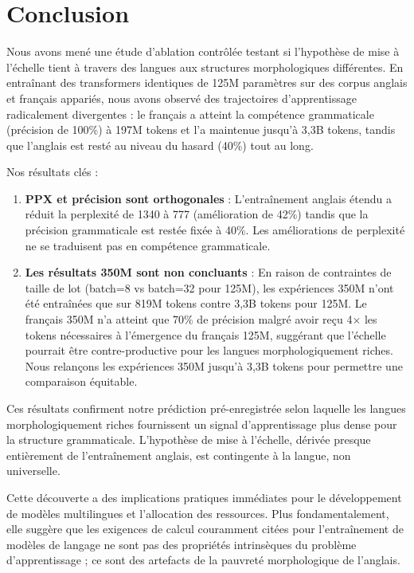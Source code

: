 \documentclass[11pt,a4paper]{article}
\begin{document}
\section{Conclusion}

Nous avons mené une étude d'ablation contrôlée testant si l'hypothèse de mise à l'échelle tient à travers des langues aux structures morphologiques différentes. En entraînant des transformers identiques de 125M paramètres sur des corpus anglais et français appariés, nous avons observé des trajectoires d'apprentissage radicalement divergentes : le français a atteint la compétence grammaticale (précision de 100\%) à 197M tokens et l'a maintenue jusqu'à 3,3B tokens, tandis que l'anglais est resté au niveau du hasard (40\%) tout au long.

Nos résultats clés :

\begin{enumerate}
    \item \textbf{PPX et précision sont orthogonales} : L'entraînement anglais étendu a réduit la perplexité de 1340 à 777 (amélioration de 42\%) tandis que la précision grammaticale est restée fixée à 40\%. Les améliorations de perplexité ne se traduisent pas en compétence grammaticale.

    \item \textbf{Les résultats 350M sont non concluants} : En raison de contraintes de taille de lot (batch=8 vs batch=32 pour 125M), les expériences 350M n'ont été entraînées que sur 819M tokens contre 3,3B tokens pour 125M. Le français 350M n'a atteint que 70\% de précision malgré avoir reçu 4$\times$ les tokens nécessaires à l'émergence du français 125M, suggérant que l'échelle pourrait être contre-productive pour les langues morphologiquement riches. Nous relançons les expériences 350M jusqu'à 3,3B tokens pour permettre une comparaison équitable.
\end{enumerate}

Ces résultats confirment notre prédiction pré-enregistrée selon laquelle les langues morphologiquement riches fournissent un signal d'apprentissage plus dense pour la structure grammaticale. L'hypothèse de mise à l'échelle, dérivée presque entièrement de l'entraînement anglais, est contingente à la langue, non universelle.

Cette découverte a des implications pratiques immédiates pour le développement de modèles multilingues et l'allocation des ressources. Plus fondamentalement, elle suggère que les exigences de calcul couramment citées pour l'entraînement de modèles de langage ne sont pas des propriétés intrinsèques du problème d'apprentissage ; ce sont des artefacts de la pauvreté morphologique de l'anglais.
\end{document}

